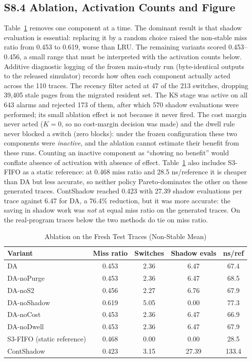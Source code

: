 \documentclass[journal,onecolumn]{IEEEtran}
\begin{document}
\subsection*{S8.4 Ablation, Activation Counts and Figure}
Table~\ref{tab:ablation} removes one component at a time. The dominant result
is that shadow evaluation is essential: replacing it by a random choice raised
the non-stable miss ratio from 0.453 to 0.619, worse than LRU. The remaining
variants scored 0.453--0.456, a small range that must be interpreted with the
activation counts below. Additive diagnostic logging of the frozen main-study
run (byte-identical outputs to the released simulator) records how often each
component actually acted across the 110 traces. The recency filter acted at
47 of the 213 switches, dropping 39,405 stale pages from the migrated resident
set. The KS stage was active on all 643 alarms and rejected 173 of them, after
which 570 shadow evaluations were performed; its small ablation effect is not
because it never fired. The cost margin never acted ($K = 0$, so no cost-margin
decision was made) and the dwell rule never blocked a switch (zero blocks):
under the frozen configuration these two components were \emph{inactive}, and
the ablation cannot estimate their benefit from these runs. Counting an
inactive component as ``showing no benefit'' would conflate absence of
activation with absence of effect. Table~\ref{tab:ablation} also includes
S3-FIFO as a static reference: at 0.468 miss ratio and 28.5 ns/reference it is
cheaper than DA but less accurate, so neither policy Pareto-dominates the
other on these generated traces. ContShadow reached 0.423 with 27.39 shadow
evaluations per trace against 6.47 for DA, a 76.4\% reduction, but it was
more accurate: the saving in shadow work was \emph{not} at equal miss ratio on
the generated traces. On the real-program traces below the two methods do tie
on miss ratio.

\begin{table}[!t]
\caption{Ablation on the Fresh Test Traces (Non-Stable Mean)}
\label{tab:ablation}
\footnotesize
\setlength{\tabcolsep}{5pt}
\begin{tabular}{@{}lcccc@{}}
\toprule
Variant & Miss ratio & Switches & Shadow evals & ns/ref \\
\midrule
DA & 0.453 & 2.36 & 6.47 & 67.4 \\
DA-noPurge & 0.453 & 2.36 & 6.47 & 68.5 \\
DA-noS2 & 0.456 & 2.27 & 6.76 & 67.9 \\
DA-noShadow & 0.619 & 5.05 & 0.00 & 77.3 \\
DA-noCost & 0.453 & 2.36 & 6.47 & 66.9 \\
DA-noDwell & 0.453 & 2.36 & 6.47 & 67.9 \\
S3-FIFO (static reference) & 0.468 & 0.00 & 0.00 & 28.5 \\
ContShadow & 0.423 & 3.15 & 27.39 & 133.4 \\
\bottomrule
\end{tabular}
\end{table}
\end{document}
